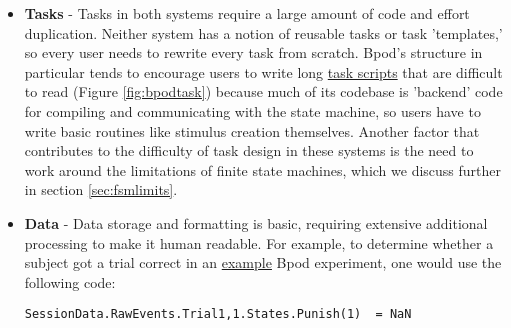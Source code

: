 \begin{itemize}[resume*, before=\vspace{0pt}, after=\vspace{\baselineskip}]%
    \item \textbf{Tasks} - Tasks in both systems require a large amount of code and effort duplication. Neither system has a notion of reusable tasks or task 'templates,' so every user needs to rewrite every task from scratch. Bpod's structure in particular tends to encourage users to write long \href{https://github.com/sanworks/Bpod_Gen2/blob/df6cd0c7d5df8247b02077b05fc263f79b86b096/Examples/Protocols/Sound/AnalogSound2AFC/AnalogSound2AFC.m}{task scripts} that are difficult to read (Figure \ref{fig:bpodtask}) because much of its codebase is 'backend' code for compiling and communicating with the state machine, so users have to write basic routines like stimulus creation themselves. Another factor that contributes to the difficulty of task design in these systems is the need to work around the limitations of finite state machines, which we discuss further in section \ref{sec:fsmlimits}.
    \item \textbf{Data} - Data storage and formatting is basic, requiring extensive additional processing to make it human readable. For example, to determine whether a subject got a trial correct in an \href{https://github.com/sanworks/Bpod_Gen2/blob/master/Examples/Protocols/Light/Light2AFC/Light2AFC.m}{example} Bpod experiment, one would use the following code:
    
    \texttt{SessionData.RawEvents.Trial{1,1}.States.Punish(1) ~= NaN}
    

\end{itemize}
